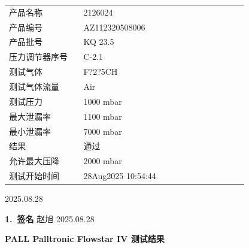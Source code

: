 \documentclass[UTF8,10pt,a4paper,fontset=fandol]{ctexart}
\newcommand{\fieldvalue}[1]{#1}
\newcommand{\handwritten}[1]{#1}
\begin{document}
\vspace{0.5em}

\begin{tabular}{@{}p{0.28\linewidth}p{0.62\linewidth}@{}}
产品名称 &
\fieldvalue{2126024} \\[2pt]
产品编号 &
\fieldvalue{AZ112320508006} \\[2pt]
产品批号 &
\fieldvalue{KQ 23.5} \\[2pt]
压力调节器序号 &
\fieldvalue{C-2.1} \\[2pt]
测试气体 &
\fieldvalue{F?2?5CH} \\[2pt]
测试气体流量 &
\fieldvalue{Air} \\[2pt]
测试压力 &
\fieldvalue{1000 mbar} \\[2pt]
最大泄漏率 &
\fieldvalue{1100 mbar} \\[2pt]
最小泄漏率 &
\fieldvalue{7000 mbar} \\[2pt]
结果 &
\fieldvalue{通过} \\[2pt]
允许最大压降 &
\fieldvalue{2000 mbar} \\[2pt]
测试开始时间 &
\fieldvalue{28Aug2025 10:54:44} \\
\end{tabular}

\vspace{1em}

\fieldvalue{\handwritten{2025.08.28}}

\vspace{1em}

\noindent
\textbf{1.\ 签名}\hfill
\fieldvalue{\handwritten{赵旭 2025.08.28}}

\vfill

\begin{center}
\textbf{PALL Palltronic Flowstar IV 测试结果}
\end{center}
\end{document}

